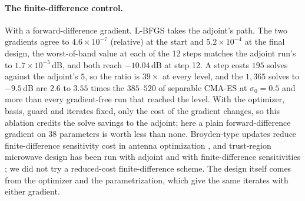 \documentclass{anvil-paper}
\begin{document}
\paragraph{The finite-difference control.}
With a forward-difference gradient, L-BFGS takes the adjoint's path. The two
gradients agree to $4.6\times10^{-7}$ (relative) at the start and
$5.2\times10^{-4}$ at the final design, the worst-of-band value at each of
the 12 steps matches the adjoint run's to $1.7\times10^{-5}$\,dB, and both
reach $-10.04$\,dB at step 12. A step costs $195$ solves against the
adjoint's $5$, so the ratio is $39\times$ at every level, and the $1{,}365$
solves to $-9.5$\,dB are $2.6$ to $3.55$ times the $385$--$520$ of separable
CMA-ES at $\sigma_0 = 0.5$ and more than every gradient-free run that
reached the level. With the optimizer, basis, guard and iterates fixed, only
the cost of the gradient changes, so this ablation credits the solve savings
to the adjoint; here a plain forward-difference gradient on 38 parameters is
worth less than none. Broyden-type updates reduce finite-difference
sensitivity cost in antenna optimization \citep{koziel2020expedited}, and
trust-region microwave design has been run with adjoint and with
finite-difference sensitivities \citep{koziel2012robust}; we did not try a
reduced-cost finite-difference scheme. The design itself comes from the optimizer and the
parametrization, which give the same iterates with either gradient.
\end{document}
